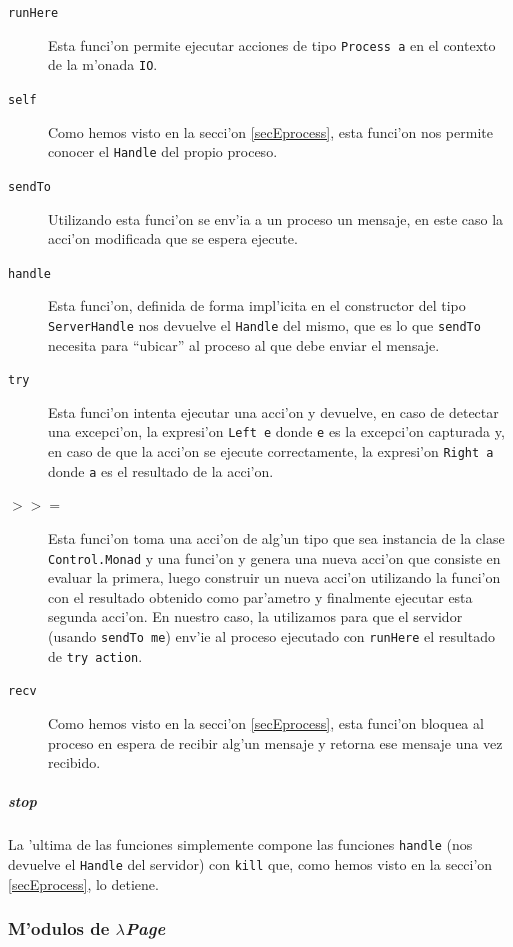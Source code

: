\documentclass[a4paper]{article}
\newcommand{\hpage}{\textbf{\textsl{$\lambda$Page}}}
\begin{document}
\begin{description}
	\item[\texttt{runHere}] Esta funci'on permite ejecutar acciones de tipo \texttt{Process a} en el contexto de la m'onada \texttt{IO}.
	\item[\texttt{self}] Como hemos visto en la secci'on \ref{secEprocess}, esta funci'on nos permite conocer el \texttt{Handle} del propio proceso.
	\item[\texttt{sendTo}] Utilizando esta funci'on se env'ia a un proceso un mensaje, en este caso la acci'on modificada que se espera ejecute.
	\item[\texttt{handle}] Esta funci'on, definida de forma impl'icita en el constructor del tipo \texttt{ServerHandle} nos devuelve el \texttt{Handle} del mismo, que es lo que \texttt{sendTo} necesita para ``ubicar'' al proceso al que debe enviar el mensaje.
	\item[\texttt{try}] Esta funci'on intenta ejecutar una acci'on y devuelve, en caso de detectar una excepci'on, la expresi'on \texttt{Left e} donde \texttt{e} es la excepci'on capturada y, en caso de que la acci'on se ejecute correctamente, la expresi'on \texttt{Right a} donde \texttt{a} es el resultado de la acci'on.
	\item[\texttt{$>>=$}] Esta funci'on toma una acci'on de alg'un tipo que sea instancia de la clase \texttt{Control.Monad} y una funci'on y genera una nueva acci'on que consiste en evaluar la primera, luego construir un nueva acci'on utilizando la funci'on con el resultado obtenido como par'ametro y finalmente ejecutar esta segunda acci'on.  En nuestro caso, la utilizamos para que el servidor (usando \texttt{sendTo me}) env'ie al proceso ejecutado con \texttt{runHere} el resultado de \texttt{try action}.
	\item[\texttt{recv}] Como hemos visto en la secci'on \ref{secEprocess}, esta funci'on bloquea al proceso en espera de recibir alg'un mensaje y retorna ese mensaje una vez recibido.
\end{description}
\subparagraph{stop} La 'ultima de las funciones simplemente compone las funciones \texttt{handle} (nos devuelve el \texttt{Handle} del servidor) con \texttt{kill} que, como hemos visto en la secci'on \ref{secEprocess}, lo detiene.

\subsubsection{M'odulos de \hpage}
\end{document}
